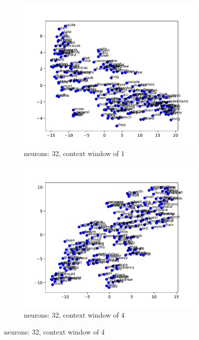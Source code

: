 \documentclass[12pt]{article} \usepackage{COSC420style} \usepackage{soul}
\begin{document}
\begin{figure}[htbp]
	\centering
	\begin{subfigure}[b]{0.45\textwidth}
		\includegraphics[width=\textwidth]{./figures/dim_32_ctx_1_embedding.pdf}
		\caption{neurons: 32, context window of 1}
		\label{fig:32_1}
	\end{subfigure}
	\begin{subfigure}[b]{0.45\textwidth}
		\includegraphics[width=\textwidth]{./figures/dim_32_ctx_4_embedding.pdf}
		\caption{neurons: 32, context window of 4}
		\label{fig:32_4}

\end{subfigure}
\end{figure}
\end{document}
